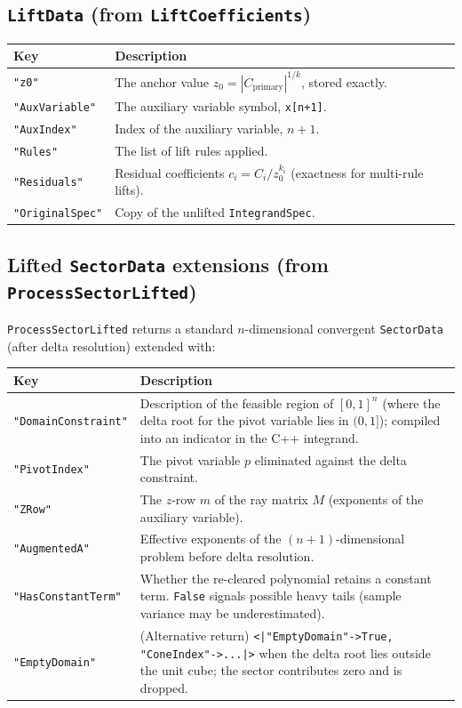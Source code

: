 \documentclass[11pt,a4paper]{article}
\begin{document}
\subsection{\texttt{LiftData} (from \texttt{LiftCoefficients})}

\begin{center}
\begin{tabular}{lp{9cm}}
\toprule
\textbf{Key} & \textbf{Description} \\
\midrule
\texttt{"z0"} & The anchor value $z_0 = |C_{\mathrm{primary}}|^{1/k}$, stored exactly. \\
\texttt{"AuxVariable"} & The auxiliary variable symbol, \texttt{x[n+1]}. \\
\texttt{"AuxIndex"} & Index of the auxiliary variable, $n+1$. \\
\texttt{"Rules"} & The list of lift rules applied. \\
\texttt{"Residuals"} & Residual coefficients $c_i = C_i / z_0^{k_i}$ (exactness for multi-rule lifts). \\
\texttt{"OriginalSpec"} & Copy of the unlifted \texttt{IntegrandSpec}. \\
\bottomrule
\end{tabular}
\end{center}

\subsection{Lifted \texttt{SectorData} extensions (from \texttt{ProcessSectorLifted})}

\texttt{ProcessSectorLifted} returns a standard $n$-dimensional convergent \texttt{SectorData} (after delta resolution) extended with:

\begin{center}
\begin{tabular}{lp{9cm}}
\toprule
\textbf{Key} & \textbf{Description} \\
\midrule
\texttt{"DomainConstraint"} & Description of the feasible region of $[0,1]^n$ (where the delta root for the pivot variable lies in $(0,1]$); compiled into an indicator in the C++ integrand. \\
\texttt{"PivotIndex"} & The pivot variable $p$ eliminated against the delta constraint. \\
\texttt{"ZRow"} & The $z$-row $m$ of the ray matrix $M$ (exponents of the auxiliary variable). \\
\texttt{"AugmentedA"} & Effective exponents of the $(n{+}1)$-dimensional problem before delta resolution. \\
\texttt{"HasConstantTerm"} & Whether the re-cleared polynomial retains a constant term. \texttt{False} signals possible heavy tails (sample variance may be underestimated). \\
\texttt{"EmptyDomain"} & (Alternative return) \texttt{<|"EmptyDomain"->True, "ConeIndex"->...|>} when the delta root lies outside the unit cube; the sector contributes zero and is dropped. \\
\bottomrule
\end{tabular}
\end{center}
\end{document}
